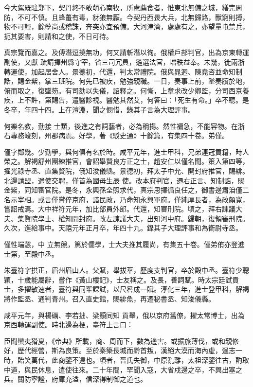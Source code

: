 \begin{pinyinscope}
 今大駕既駐鄴下，契丹終不敢萌心南牧，所慮薦食者，惟東北無備之城，繕完周防，不可不慎。且蜂蠆有毒，豺狼無厭。今契丹西畏大兵，北無歸路，獸窮則搏，物不可輕，餘孽尚或稽誅，奔突亦宜預備。大河津濟，處處有之，亦望量屯禁兵，扼其要害，則請和之使，不日可待。



 真宗覽而嘉之。及傅潛逗撓無功，何又請斬潛以徇。俄權戶部判官，出為京東轉運副使，又獻
 疏請擇州縣守宰，省三司冗員，遴選法官，增秩益奉。未幾，徙兩浙轉運使，加起居舍人。景德初，代還，判太常禮院。俄與晁迥、陳堯咨並命知制誥，賜金紫，掌三班院。何先已被疾，勉強親職。一日，奏事上前，墜奏牘於地，俯而取之，復墜笏。有司劾以失儀，詔釋之。何慚，上章求改少卿監，分司西京養疾，上不許，第賜告，遣醫診視。醫勉其然艾，何答曰：「死生有命。」卒不聽。是冬卒，年四十四。上在澶淵，聞之憫惜，錄其子言為大理評事。



 何樂名教，勤接
 士類，後進之有詞藝者，必為稱揚。然性褊急，不能容物。在浙右專務峻刻，州郡病焉。好學，著《駁史通》十餘篇，有集四十卷。弟僅。



 僅字鄰幾。少勤學，與何俱有名於時。咸平元年，進士甲科，兄弟連冠貢籍，時人榮之。解褐舒州團練推官，會詔舉賢良方正之士，趙安仁以僅名聞。策入第四等，擢光祿寺丞、直集賢院，俄知浚儀縣。景德初，拜太子中允、開封府推官，賜緋。北邊請盟，遣使交聘，僅首為國母生辰
 使。改本府判官，遷右正言、知制誥，賜金紫，同知審官院。是冬，永興孫全照求代，真宗思擇循良任之，御書邊肅洎僅二名示宰相。或言僅嘗倅京府，諳民政，乃命知永興軍府。僅純厚長者，為政頗寬，嘗詔戒焉。大中祥符元年，加比部員外郎。代還，知審刑院。頃之，拜右諫議大夫、集賢院學士、權知開封府。改左諫議大夫，出知河中府。歸朝，復領審刑院。久次，進給事中。天禧元年正月卒，年四十九。錄其子大理評事和為衛尉寺丞。



 僅性端愨，中
 立無競，篤於儒學，士大夫推其履尚，有集五十卷。僅弟侑亦登進士第，至殿中丞。



 朱臺符字拱正，眉州眉山人。父賦，舉拔萃，歷度支判官，卒於殿中丞。臺符少聰穎，十歲能屬辭，嘗作《黃山樓記》，士友稱之。及長，善詞賦。時太宗廷試貢士，多擢敏速者，臺符與同輩課試，以尺晷成一賦。淳化三年，進士登甲科，解褐將作監丞、通判青州。召入直史館，賜緋魚，再遷秘書丞、知浚儀縣。



 咸平元年，與楊礪、李若拙、梁顥同知
 貢舉，俄以京府舊僚，擢太常博士，出為京西轉運副使。時北邊為梗，臺符上言曰：



 臣聞蠻夷猾夏，《帝典》所載，商、周而下，數為邊害。或振旅薄伐，或和親修好，歷代經營，斯為良策。至於秦築長城而黔首叛，漢絕大漠而海內虛，逞志一時，貽笑萬代，此商鑒不遠也。頃者，晉氏失御，中原亂離，太祖深鑒往古，酌取中道，與民休息，遣使往來。二十年間，罕聞入寇，大省戍邊之卒，不興出塞之兵。關防寧謐，府庫充溢，信深得制御之道也。




\end{pinyinscope}

